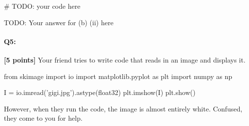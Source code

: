 \documentclass[11pt]{article}
\begin{document}
\begin{enumerate}[(a)]
\begin{enumerate}[(i)]
\begin{tcolorbox}[colback=white!5!white,colframe=green!75!black,height=10cm]
    \begin{python}
    # TODO: your code here
    \end{python}

    TODO: Your answer for (b) (ii) here 
    
    
\end{tcolorbox}

\end{enumerate}
\end{enumerate}


\pagebreak
    \paragraph{Q5:} \textbf{[5 points]} Your friend tries to write code that reads in an image and displays it. 
    
    \begin{python}
        from skimage import io
        import matplotlib.pyplot as plt
        import numpy as np

        I = io.imread('gigi.jpg').astype(float32)
        plt.imshow(I)
        plt.show()
    \end{python}
    
    However, when they run the code, the image is almost entirely white. Confused, they come to you for help.
\end{document}
